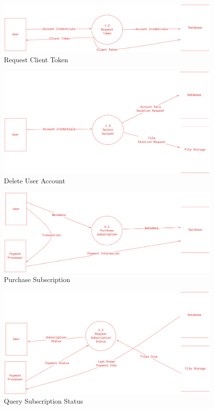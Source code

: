 \documentclass[12pt,a4paper]{report}
\begin{document}
\begin{figure}[H]
	\includegraphics[width=\textwidth]{dfd-L2-request_token.png}
	\caption{Request Client Token}
\end{figure}

\begin{figure}[H]
	\includegraphics[width=\textwidth]{dfd-L2-delete_account.png}
	\caption{Delete User Account}
\end{figure}

\begin{figure}[H]
	\includegraphics[width=\textwidth]{dfd-L2-purchase_subscription.png}
	\caption{Purchase Subscription}
\end{figure}

\begin{figure}[H]
	\includegraphics[width=\textwidth]{dfd-L2-status_subscription.png}
	\caption{Query Subscription Status}
\end{figure}
\end{document}
